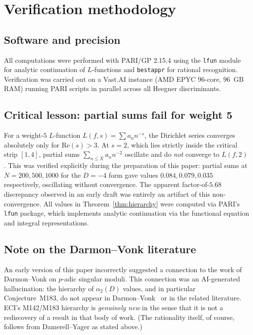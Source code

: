 \documentclass[12pt]{amsart}
\theoremstyle{definition}
\begin{document}
\section{Verification methodology}
\label{sec:verify}

\subsection{Software and precision}

All computations were performed with PARI/GP 2.15.4 \cite{PARI215}
using the \texttt{lfun} module for analytic continuation of $L$-functions
and \texttt{bestappr} for rational recognition.
Verification was carried out on a Vast.AI instance (AMD EPYC 96-core, $96$~GB
RAM) running PARI scripts in parallel across all Heegner discriminants.

\subsection{Critical lesson: partial sums fail for weight 5}

For a weight-$5$ $L$-function $L(f,s) = \sum a_n n^{-s}$, the Dirichlet
series converges absolutely only for $\mathrm{Re}(s) > 3$.
At $s = 2$, which lies strictly inside the critical strip $[1,4]$, partial
sums $\sum_{n \leq X} a_n n^{-2}$ oscillate and do \emph{not} converge to
$L(f,2)$.
This was verified explicitly during the preparation of this paper:
partial sums at $N = 200, 500, 1000$ for the $D=-4$ form gave values
$0.084, 0.079, 0.035$ respectively, oscillating without convergence.
The apparent factor-of-$5.68$ discrepancy observed in an early draft was
entirely an artifact of this non-convergence.
All values in Theorem~\ref{thm:hierarchy} were computed via PARI's
\texttt{lfun} package, which implements analytic continuation via the
functional equation and integral representations.

\subsection{Note on the Darmon--Vonk literature}

An early version of this paper incorrectly suggested a connection to the
work of Darmon--Vonk on $p$-adic singular moduli.
This connection was an AI-generated hallucination: the hierarchy of
$\alpha_2(D)$ values, and in particular Conjecture~M183, do not appear
in Darmon--Vonk~\cite{DarmonVonk2021} or in the related literature.
ECI's M142/M183 hierarchy is \emph{genuinely new} in the sense that it is
not a rediscovery of a result in that body of work.
(The rationality itself, of course, follows from Damerell--Yager as stated
above.)
\end{document}
